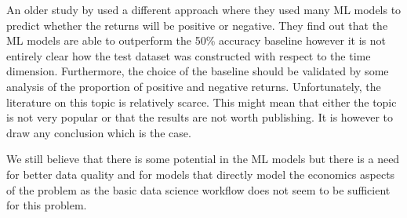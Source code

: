 An older study by \cite{Akyildirim2020} 
used a different approach 
where they used many \ac{ML} models to predict
whether the returns will be positive or negative. 
They find out that the \ac{ML} models are able to outperform 
the 50\% accuracy baseline however 
it is not entirely clear how the test dataset was constructed with
respect to the time dimension. Furthermore, 
the choice of the baseline should be validated
by some analysis of the proportion of positive and negative returns.
Unfortunately, the literature on
this topic is relatively scarce. This might mean
that either the topic is not very popular or that the results are not worth
publishing. It is however to draw any conclusion which is the case.

We still believe that there is some potential in the \ac{ML} models
but there is a need for better data quality and for models
that directly model the economics aspects of the problem
as the basic data science workflow does not seem 
to be sufficient for this problem.




